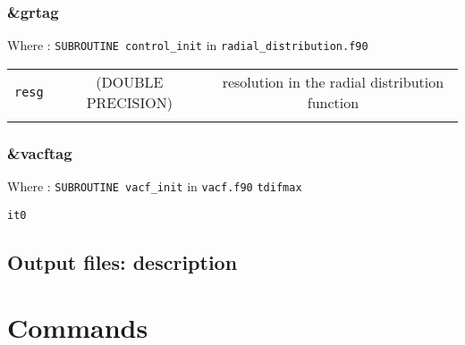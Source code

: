 \documentclass[10pt,a4paper]{article}
\begin{document}

\subsubsection{\&grtag}

Where : \verb?SUBROUTINE control_init? in \verb?radial_distribution.f90?

\begin{tabular}{ccc}
\\
\verb?resg? & (DOUBLE PRECISION) & resolution in the radial distribution function \\
\\
\end{tabular}

\subsubsection{\&vacftag}

Where : \verb?SUBROUTINE vacf_init? in \verb?vacf.f90?
\verb?tdifmax? 

\verb?it0?

\subsection{Output files: description}


\section{Commands}
\end{document}
